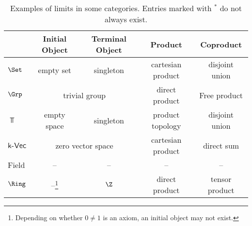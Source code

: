 \begin{table}[ht]
    \label{tab:limit-examples}
    \centering
\begin{tabular}{l|c|c|c|c}
	& Initial Object & Terminal Object & Product & Coproduct \\ \hline
	$\Set$ & empty set & singleton & cartesian product & disjoint union \\
	$\Grp$ & \multicolumn{2}{c|}{trivial group} 
	& direct product & Free product \\
	$\Top$ & empty space & singleton & product topology & disjoint union \\
  $\textsf{k-Vec}$ & \multicolumn{2}{c|}{zero vector space} & cartesian product & direct sum \\
	Field & -- & -- & -- & --\\
	$\Ring$ & --\footnote{Depending on whether $0 \neq 1$ is an axiom, an initial object may not exist.} & $\Z$ & direct product & tensor product
\end{tabular}
    \caption{Examples of limits in some categories.
    Entries marked with $^\ast$ do not always exist.}
\end{table}


